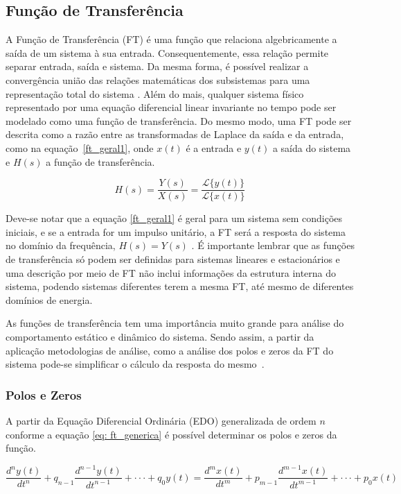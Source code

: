 \subsection{Função de Transferência}
A Função de Transferência (FT) é uma função que relaciona algebricamente a saída de um sistema à sua entrada. Consequentemente, essa relação permite separar entrada, saída e sistema. Da mesma forma, é possível realizar a convergência união das relações matemáticas dos subsistemas para uma representação total do sistema \cite{nise}. Além do mais, qualquer sistema físico representado por uma equação diferencial linear invariante no tempo pode ser modelado como uma função de transferência. Do mesmo modo, uma FT pode ser descrita como a razão entre as transformadas de Laplace da saída e da entrada, como na equação~\ref{ft_geral1}, onde $x(t)$ é a entrada e $y(t)$ a saída do sistema e $H(s)$ a função de transferência. 	


\begin{equation}\label{ft_geral1}
    H(s) = \frac{Y(s)}{X(s)} = \frac{\mathcal{L}\{y(t)\}}{\mathcal{L}\{x(t)\}}
\end{equation}

Deve-se notar que a equação \ref{ft_geral1} é geral para um sistema sem condições iniciais, e se a entrada for um impulso unitário, a FT será a resposta do sistema no domínio da frequência, $H(s) = Y(s)$ \cite{Khoo2000}. É importante lembrar que as funções de transferência só podem ser definidas para sistemas lineares e estacionários \cite{dorf} e uma descrição por meio de FT não inclui informações da estrutura interna do sistema, podendo sistemas diferentes terem a mesma FT, até mesmo de diferentes domínios de energia. 

As funções de transferência tem uma importância muito grande para análise do comportamento estático e dinâmico do sistema. Sendo assim, a partir da aplicação metodologias de análise, como a análise dos polos e zeros da FT do sistema pode-se simplificar o cálculo da resposta do mesmo~\cite{nise}.

\subsubsection{Polos e Zeros}

A partir da Equação Diferencial Ordinária (EDO) generalizada de ordem $n$ conforme a equação \ref{eq: ft_generica} é possível determinar os polos e zeros da função.

\begin{equation}\label{eq: ft_generica}
    \frac{d^ny(t)}{dt^n} + q_{n-1}\frac{d^{n-1}y(t)}{dt^{n-1}} +\cdot\cdot\cdot+q_0y(t) =
    \frac{d^mx(t)}{dt^m} + p_{m-1}\frac{d^{m-1}x(t)}{dt^{m-1}} +\cdot\cdot\cdot+p_0x(t) 
\end{equation}

